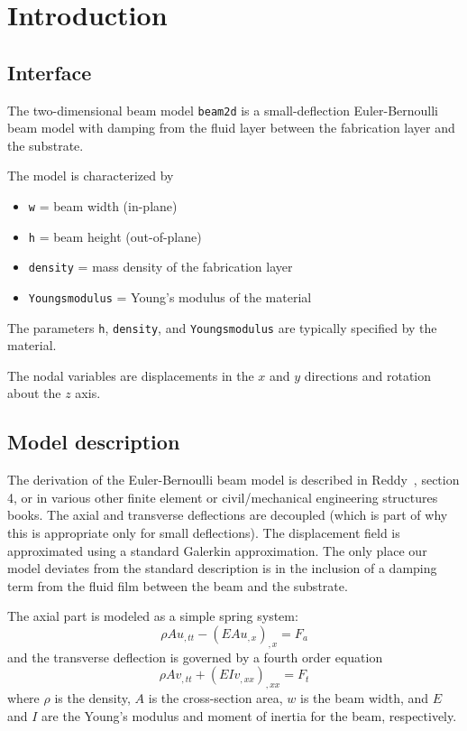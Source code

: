 
\section{Introduction}

\subsection{Interface}

The two-dimensional beam model {\tt{}beam2d} is a small-deflection 
Euler-Bernoulli beam model with damping from the fluid layer between
the fabrication layer and the substrate.

The model is characterized by
\begin{itemize}
 \item {\tt{}w} = beam width (in-plane)
 \item {\tt{}h} = beam height (out-of-plane)
 \item {\tt{}density} = mass density of the fabrication layer
 \item {\tt{}Youngsmodulus} = Young's modulus of the material %
\end{itemize}

The parameters {\tt{}h}, {\tt{}density}, 
and {\tt{}Youngsmodulus} are typically specified by the material.

The nodal variables are displacements in the $x$ and $y$ directions
and rotation about the $z$ axis.


\subsection{Model description}

The derivation of the Euler-Bernoulli beam model is described in 
Reddy~\cite{Redd93}, section 4, or in various other finite element 
or civil/mechanical engineering structures books.  
The axial and transverse deflections
are decoupled (which is part of why this is appropriate only for
small deflections).  The displacement field is approximated using
a standard Galerkin approximation.  The only place our model deviates
from the standard description is in the inclusion of a damping term
from the fluid film between the beam and the substrate.

The axial part is modeled as a simple spring system:
\[
  \rho A u_{,tt} - (E A u_{,x})_{,x} = F_{a}
\]
and the transverse deflection is governed by a fourth order
equation
\[
  \rho A v_{,tt} + (E I v_{,xx})_{,xx} = F_{t}
\]
where $\rho$ is the density, $A$ is the cross-section area,
$w$ is the beam width, 
and $E$ and $I$ are the
Young's modulus and moment of inertia for the beam, respectively. %


